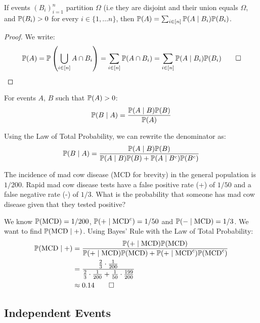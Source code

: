 \begin{thmbox}
   If events $(B_i)_{i = 1}^n$ partition $\Omega$ (i.e they are disjoint and their union equals $\Omega$, and $\mathbb{P}(B_i) > 0$ for every $i \in \{1, \dots n\}$, then $\mathbb{P}(A) = \sum_{i \in [n]} \mathbb{P}(A \mid B_i)\mathbb{P}(B_i)$. 
\end{thmbox}
\begin{proof}
   We write:
   \[ \mathbb{P}(A) = \mathbb{P}\left(\bigcup_{i \in [n]} A \cap B_i \right) = \sum_{i \in [n]} \mathbb{P}(A \cap B_i) = \sum_{i \in [n]}\mathbb{P}(A \mid B_i)\mathbb{P}(B_i) \qedhere \]
\end{proof}

\begin{thmbox}
   For events $A$, $B$ such that $\mathbb{P}(A) > 0$:
   \[ \mathbb{P}(B \mid A) = \displaystyle\frac{\mathbb{P}(A \mid B)\mathbb{P}(B)}{\mathbb{P}(A)} \]
\end{thmbox}

\begin{remark}
   Using the Law of Total Probability, we can rewrite the denominator as:
   \[ \mathbb{P}(B \mid A) = \displaystyle\frac{\mathbb{P}(A \mid B)\mathbb{P}(B)}{\mathbb{P}(A \mid B)\mathbb{P}(B) + \mathbb{P}(A \mid B^c)\mathbb{P}(B^c)} \]
\end{remark}

\begin{example}
   The incidence of mad cow disease (MCD for brevity) in the general population is $1/200$. Rapid mad cow disease tests have a false positive rate (+) of $1/50$ and a false negative rate (-) of $1/3$. What is the probability that someone has mad cow disease given that they tested positive?
\end{example}
\begin{solution}
   We know $\mathbb{P}(\text{MCD}) = 1/200$, $\mathbb{P}(+ \mid \text{MCD}^c) = 1/50$ and $\mathbb{P}(- \mid \text{MCD}) = 1/3$. We want to find $\mathbb{P}(\text{MCD} \mid +)$. Using Bayes' Rule with the Law of Total Probability:
  \begin{align*}
     \mathbb{P}(\text{MCD} \mid +) &= \displaystyle\frac{\mathbb{P}(+ \mid \text{MCD})\mathbb{P}(\text{MCD})}{\mathbb{P}(+ \mid \text{MCD})\mathbb{P}(\text{MCD}) + \mathbb{P}(+ \mid \text{MCD}^c)\mathbb{P}(\text{MCD}^c)} \\
&= \frac{\frac{2}{3} \cdot \frac{1}{200}}{\frac{2}{3} \cdot \frac{1}{200} + \frac{1}{50} \cdot \frac{199}{200}} \\
&\approx 0.14 \qedhere
\end{align*}
\end{solution}

\subsection{Independent Events}

